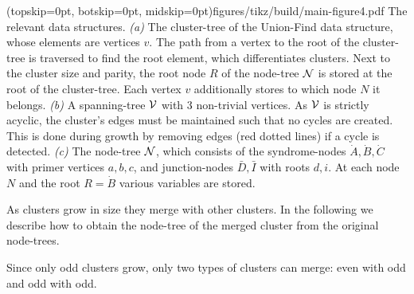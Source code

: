 \Figure[tb](topskip=0pt, botskip=0pt, midskip=0pt){figures/tikz/build/main-figure4.pdf}{
    The relevant data structures. \emph{(a)} The cluster-tree of the Union-Find data structure, whose elements are vertices $v$. The path from a vertex to the root of the cluster-tree is traversed to find the root element, which differentiates clusters. Next to the cluster size and parity, the root node $R$ of the node-tree $\mathcal{N}$ is stored at the root of the cluster-tree. Each vertex $v$ additionally stores to which node $N$ it belongs. \emph{(b)} A spanning-tree $\mathcal{V}$ with 3 non-trivial vertices. As $\mathcal{V}$ is strictly acyclic, the cluster's edges must be maintained such that no cycles are created. This is done during growth by removing edges (red dotted lines) if a cycle is detected. \emph{(c)} The node-tree $\mathcal{N}$, which consists of the syndrome-nodes $\dot{A}, \dot{B}, \dot{C}$ with primer vertices $a, b, c$, and junction-nodes $\bar{D}, \bar{I}$ with roots $d,i$. At each node $N$ and the root $R=\dot{B}$ various variables are stored.\label{fig:nodetypes}}

As clusters grow in size they merge with other clusters. 
In the following we describe how to obtain the node-tree of the merged cluster from the original node-trees. %


Since only odd clusters grow, only two types of clusters can merge: even with odd and odd with odd. 

